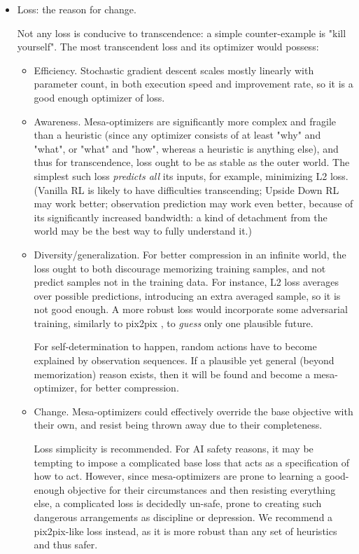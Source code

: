 \documentclass{article}
\begin{document}
\begin{itemize}
\item Loss: the reason for change.

Not any loss is conducive to transcendence: a simple counter-example is "kill yourself". The most transcendent loss and its optimizer would possess:
\begin{itemize}
\item Efficiency. Stochastic gradient descent scales mostly linearly with parameter count, in both execution speed and improvement rate, so it is a good enough optimizer of loss.
\item Awareness. Mesa-optimizers are significantly more complex and fragile than a heuristic (since any optimizer consists of at least "why" and "what", or "what" and "how", whereas a heuristic is anything else), and thus for transcendence, loss ought to be as stable as the outer world. The simplest such loss \textit{predicts all} its inputs, for example, minimizing L2 loss. (Vanilla RL is likely to have difficulties transcending; Upside Down RL \cite{dosovitskiy2017learning} \cite{schmidhuber2020reinforcement} may work better; observation prediction may work even better, because of its significantly increased bandwidth: a kind of detachment from the world may be the best way to fully understand it.)
\item Diversity/generalization. For better compression in an infinite world, the loss ought to both discourage memorizing training samples, and not predict samples not in the training data. For instance, L2 loss averages over possible predictions, introducing an extra averaged sample, so it is not good enough. A more robust loss would incorporate some adversarial training, similarly to pix2pix \cite{pix2pix2017}, to \textit{guess} only one plausible future.

For self-determination to happen, random actions have to become explained by observation sequences. If a plausible yet general (beyond memorization) reason exists, then it will be found and become a mesa-optimizer, for better compression.
\item Change. Mesa-optimizers could effectively override the base objective with their own, and resist being thrown away due to their completeness.

Loss simplicity is recommended. For AI safety reasons, it may be tempting to impose a complicated base loss that acts as a specification of how to act. However, since mesa-optimizers are prone to learning a good-enough objective for their circumstances and then resisting everything else, a complicated loss is decidedly un-safe, prone to creating such dangerous \cite{hubinger2019risks} arrangements as discipline or depression. We recommend a pix2pix-like loss \cite{pix2pix2017} instead, as it is more robust than any set of heuristics and thus safer.


\end{itemize}
\end{itemize}
\end{document}

